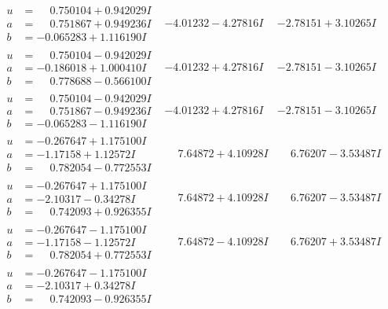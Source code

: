 \documentclass[1p]{elsarticle_modified}
\theoremstyle{definition}
\begin{document}
$$\begin{array}{c|c|c}
\begin{aligned}
u &= \phantom{-}0.750104 + 0.942029 I \\
a &= \phantom{-}0.751867 + 0.949236 I \\
b &= -0.065283 + 1.116190 I\end{aligned}
 & -4.01232 - 4.27816 I & -2.78151 + 3.10265 I \\ \hline\begin{aligned}
u &= \phantom{-}0.750104 - 0.942029 I \\
a &= -0.186018 + 1.000410 I \\
b &= \phantom{-}0.778688 - 0.566100 I\end{aligned}
 & -4.01232 + 4.27816 I & -2.78151 - 3.10265 I \\ \hline\begin{aligned}
u &= \phantom{-}0.750104 - 0.942029 I \\
a &= \phantom{-}0.751867 - 0.949236 I \\
b &= -0.065283 - 1.116190 I\end{aligned}
 & -4.01232 + 4.27816 I & -2.78151 - 3.10265 I \\ \hline\begin{aligned}
u &= -0.267647 + 1.175100 I \\
a &= -1.17158 + 1.12572 I \\
b &= \phantom{-}0.782054 - 0.772553 I\end{aligned}
 & \phantom{-}7.64872 + 4.10928 I & \phantom{-}6.76207 - 3.53487 I \\ \hline\begin{aligned}
u &= -0.267647 + 1.175100 I \\
a &= -2.10317 - 0.34278 I \\
b &= \phantom{-}0.742093 + 0.926355 I\end{aligned}
 & \phantom{-}7.64872 + 4.10928 I & \phantom{-}6.76207 - 3.53487 I \\ \hline\begin{aligned}
u &= -0.267647 - 1.175100 I \\
a &= -1.17158 - 1.12572 I \\
b &= \phantom{-}0.782054 + 0.772553 I\end{aligned}
 & \phantom{-}7.64872 - 4.10928 I & \phantom{-}6.76207 + 3.53487 I \\ \hline\begin{aligned}
u &= -0.267647 - 1.175100 I \\
a &= -2.10317 + 0.34278 I \\
b &= \phantom{-}0.742093 - 0.926355 I\end{aligned}

\end{array}$$
\end{document}
